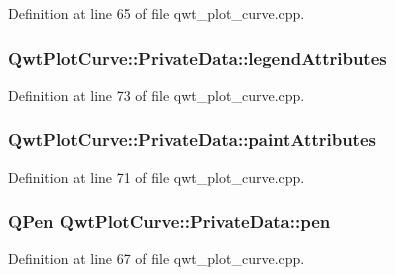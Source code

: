 Definition at line 65 of file qwt\-\_\-plot\-\_\-curve.\-cpp.

\hypertarget{class_qwt_plot_curve_1_1_private_data_acfc0224fcffc62660df356d4025c82ee}{
\subsubsection[{legend\-Attributes}]{ Qwt\-Plot\-Curve\-::\-Private\-Data\-::legend\-Attributes}}\label{class_qwt_plot_curve_1_1_private_data_acfc0224fcffc62660df356d4025c82ee}


Definition at line 73 of file qwt\-\_\-plot\-\_\-curve.\-cpp.

\hypertarget{class_qwt_plot_curve_1_1_private_data_a07ff7c0da3fb7b49d0745e1b57e92f2d}{
\subsubsection[{paint\-Attributes}]{ Qwt\-Plot\-Curve\-::\-Private\-Data\-::paint\-Attributes}}\label{class_qwt_plot_curve_1_1_private_data_a07ff7c0da3fb7b49d0745e1b57e92f2d}


Definition at line 71 of file qwt\-\_\-plot\-\_\-curve.\-cpp.

\hypertarget{class_qwt_plot_curve_1_1_private_data_a01efdb4d5626885be4dce38a18f52c66}{
\subsubsection[{pen}]{\setlength{\rightskip}{0pt plus 5cm}Q\-Pen Qwt\-Plot\-Curve\-::\-Private\-Data\-::pen}}\label{class_qwt_plot_curve_1_1_private_data_a01efdb4d5626885be4dce38a18f52c66}


Definition at line 67 of file qwt\-\_\-plot\-\_\-curve.\-cpp.

